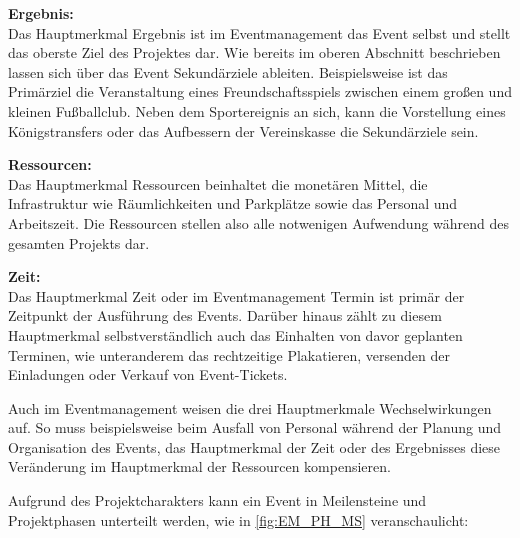 \textbf{Ergebnis:} 
\\
Das Hauptmerkmal Ergebnis ist im Eventmanagement das Event selbst und stellt das oberste Ziel des Projektes dar. Wie bereits im oberen Abschnitt beschrieben lassen sich über das Event Sekundärziele ableiten. Beispielsweise ist das Primärziel die Veranstaltung eines Freundschaftsspiels zwischen einem großen und kleinen Fußballclub. Neben dem Sportereignis an sich, kann die Vorstellung eines Königstransfers oder das Aufbessern der Vereinskasse die Sekundärziele sein.

\textbf{Ressourcen:}
\\
Das Hauptmerkmal Ressourcen beinhaltet die monetären Mittel, die Infrastruktur wie Räumlichkeiten und Parkplätze sowie das Personal und Arbeitszeit. Die Ressourcen stellen also alle notwenigen Aufwendung während des gesamten Projekts dar.

\textbf{Zeit:}
\\
Das Hauptmerkmal Zeit oder im Eventmanagement Termin ist primär der Zeitpunkt der Ausführung des Events. Darüber hinaus zählt zu diesem Hauptmerkmal selbstverständlich auch das Einhalten von davor geplanten Terminen, wie unteranderem das rechtzeitige Plakatieren, versenden der Einladungen oder Verkauf von Event-Tickets.

Auch im Eventmanagement weisen die drei Hauptmerkmale Wechselwirkungen auf. So muss beispielsweise beim Ausfall von Personal während der Planung und Organisation des Events, das Hauptmerkmal der Zeit oder des Ergebnisses diese Veränderung im Hauptmerkmal der Ressourcen kompensieren. 

Aufgrund des Projektcharakters kann  ein Event in Meilensteine und Projektphasen unterteilt werden, wie in \autoref{fig:EM_PH_MS} veranschaulicht:

